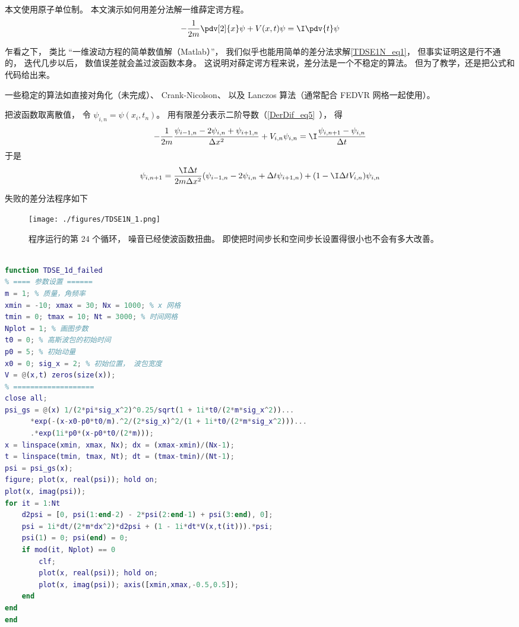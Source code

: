 

本文使用原子单位制。 本文演示如何用差分法解一维薛定谔方程。
\begin{equation}\label{TDSE1N_eq1}
-\frac{1}{2m}\pdv[2]{x}\psi + V(x,t)\psi = \I\pdv{t}\psi
\end{equation}

乍看之下， 类比 “一维波动方程的简单数值解（Matlab）”， 我们似乎也能用简单的差分法求解\autoref{TDSE1N_eq1}， 但事实证明这是行不通的， 迭代几步以后， 数值误差就会盖过波函数本身。 这说明对薛定谔方程来说，差分法是一个不稳定的算法。 但为了教学，还是把公式和代码给出来。

一些稳定的算法如直接对角化（未完成）、 Crank-Nicolson、 以及 Lanczos 算法（通常配合 FEDVR 网格一起使用）。

把波函数取离散值， 令 $\psi_{i,n} = \psi(x_i,t_n)$。 用有限差分表示二阶导数（\autoref{DerDif_eq5}~）， 得
\begin{equation}
-\frac{1}{2m}\frac{\psi_{i-1,n} - 2\psi_{i,n} + \psi_{i+1,n}}{\Delta x^2} + V_{i,n}\psi_{i,n} = \I \frac{\psi_{i, n+1} - \psi_{i, n}}{\Delta t}
\end{equation}
于是
\begin{equation}
\psi_{i, n+1} = \frac{\I\Delta t}{2m\Delta x^2} (\psi_{i-1,n} - 2\psi_{i,n} + \Delta t\psi_{i+1,n}) + (1-\I \Delta t V_{i,n})\psi_{i,n}
\end{equation}

失败的差分法程序如下
\begin{figure}[ht]
\centering
\texttt{[image: ./figures/TDSE1N\_1.png]}
\caption{程序运行的第 24 个循环， 噪音已经使波函数扭曲。 即使把时间步长和空间步长设置得很小也不会有多大改善。} \label{TDSE1N_fig1}
\end{figure}

\begin{lstlisting}[language=matlab, caption=TDSE\_1d\_failed.m]
% 差分法解一维薛定谔方程

function TDSE_1d_failed
% ==== 参数设置 ======
m = 1; % 质量，角频率
xmin = -10; xmax = 30; Nx = 1000; % x 网格
tmin = 0; tmax = 10; Nt = 3000; % 时间网格
Nplot = 1; % 画图步数
t0 = 0; % 高斯波包的初始时间
p0 = 5; % 初始动量
x0 = 0; sig_x = 2; % 初始位置， 波包宽度
V = @(x,t) zeros(size(x));
% ===================
close all;
psi_gs = @(x) 1/(2*pi*sig_x^2)^0.25/sqrt(1 + 1i*t0/(2*m*sig_x^2))...
      *exp(-(x-x0-p0*t0/m).^2/(2*sig_x)^2/(1 + 1i*t0/(2*m*sig_x^2)))...
      .*exp(1i*p0*(x-p0*t0/(2*m)));
x = linspace(xmin, xmax, Nx); dx = (xmax-xmin)/(Nx-1);
t = linspace(tmin, tmax, Nt); dt = (tmax-tmin)/(Nt-1);
psi = psi_gs(x);
figure; plot(x, real(psi)); hold on;
plot(x, imag(psi));
for it = 1:Nt
    d2psi = [0, psi(1:end-2) - 2*psi(2:end-1) + psi(3:end), 0];
    psi = 1i*dt/(2*m*dx^2)*d2psi + (1 - 1i*dt*V(x,t(it))).*psi;
    psi(1) = 0; psi(end) = 0;
    if mod(it, Nplot) == 0
        clf;
        plot(x, real(psi)); hold on;
        plot(x, imag(psi)); axis([xmin,xmax,-0.5,0.5]);
    end
end
end
\end{lstlisting}
